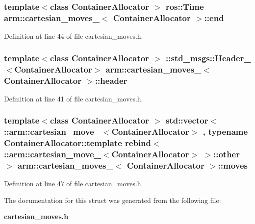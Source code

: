 \subsubsection[{end}]{\setlength{\rightskip}{0pt plus 5cm}template$<$class Container\-Allocator $>$ ros\-::\-Time {\bf arm\-::cartesian\-\_\-moves\-\_\-}$<$ \-Container\-Allocator $>$\-::{\bf end}}\label{structarm_1_1cartesian__moves___a8c6d82709c65acc08a450bc91108be33}


\-Definition at line 44 of file cartesian\-\_\-moves.\-h.

\subsubsection[{header}]{\setlength{\rightskip}{0pt plus 5cm}template$<$class Container\-Allocator $>$ \-::std\-\_\-msgs\-::\-Header\-\_\-$<$\-Container\-Allocator$>$ {\bf arm\-::cartesian\-\_\-moves\-\_\-}$<$ \-Container\-Allocator $>$\-::{\bf header}}\label{structarm_1_1cartesian__moves___adcc12d6fa0a1fe3f9aa755b12f16789b}


\-Definition at line 41 of file cartesian\-\_\-moves.\-h.

\subsubsection[{moves}]{\setlength{\rightskip}{0pt plus 5cm}template$<$class Container\-Allocator $>$ std\-::vector$<$ \-::{\bf arm\-::cartesian\-\_\-move\-\_\-}$<$\-Container\-Allocator$>$ , typename \-Container\-Allocator\-::template rebind$<$ \-::{\bf arm\-::cartesian\-\_\-move\-\_\-}$<$\-Container\-Allocator$>$ $>$\-::other $>$ {\bf arm\-::cartesian\-\_\-moves\-\_\-}$<$ \-Container\-Allocator $>$\-::{\bf moves}}\label{structarm_1_1cartesian__moves___ae321f9f2594be4e14442c2d20060090d}


\-Definition at line 47 of file cartesian\-\_\-moves.\-h.



\-The documentation for this struct was generated from the following file\-:\begin{DoxyCompactItemize}
\item 
{\bf cartesian\-\_\-moves.\-h}\end{DoxyCompactItemize}
